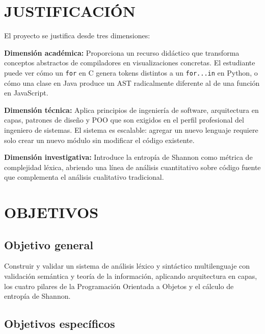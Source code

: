 \documentclass[12pt,a4paper]{article}
\begin{document}
\section{JUSTIFICACIÓN}

El proyecto se justifica desde tres dimensiones:

\textbf{Dimensión académica:} Proporciona un recurso didáctico que transforma conceptos abstractos de compiladores en visualizaciones concretas. El estudiante puede ver cómo un \texttt{for} en C genera tokens distintos a un \texttt{for...in} en Python, o cómo una clase en Java produce un AST radicalmente diferente al de una función en JavaScript.

\textbf{Dimensión técnica:} Aplica principios de ingeniería de software, arquitectura en capas, patrones de diseño y POO que son exigidos en el perfil profesional del ingeniero de sistemas. El sistema es escalable: agregar un nuevo lenguaje requiere solo crear un nuevo módulo sin modificar el código existente.

\textbf{Dimensión investigativa:} Introduce la entropía de Shannon como métrica de complejidad léxica, abriendo una línea de análisis cuantitativo sobre código fuente que complementa el análisis cualitativo tradicional.

\section{OBJETIVOS}

\subsection{Objetivo general}

Construir y validar un sistema de análisis léxico y sintáctico multilenguaje con validación semántica y teoría de la información, aplicando arquitectura en capas, los cuatro pilares de la Programación Orientada a Objetos y el cálculo de entropía de Shannon.

\subsection{Objetivos específicos}
\end{document}
